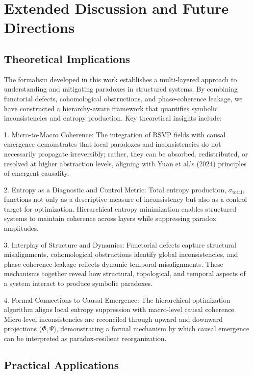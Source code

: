 \documentclass[12pt]{article}
\theoremstyle{plain}
\begin{document}
\section{Extended Discussion and Future Directions}

\subsection{Theoretical Implications}

The formalism developed in this work establishes a multi-layered approach to understanding and mitigating paradoxes in structured systems. By combining functorial defects, cohomological obstructions, and phase-coherence leakage, we have constructed a hierarchy-aware framework that quantifies symbolic inconsistencies and entropy production. Key theoretical insights include:

1. Micro-to-Macro Coherence: The integration of RSVP fields with causal emergence demonstrates that local paradoxes and inconsistencies do not necessarily propagate irreversibly; rather, they can be absorbed, redistributed, or resolved at higher abstraction levels, aligning with Yuan et al.’s (2024) principles of emergent causality.

2. Entropy as a Diagnostic and Control Metric: Total entropy production, \(\sigma_{\mathrm{total}}\), functions not only as a descriptive measure of inconsistency but also as a control target for optimization. Hierarchical entropy minimization enables structured systems to maintain coherence across layers while suppressing paradox amplitudes.

3. Interplay of Structure and Dynamics: Functorial defects capture structural misalignments, cohomological obstructions identify global inconsistencies, and phase-coherence leakage reflects dynamic temporal misalignments. These mechanisms together reveal how structural, topological, and temporal aspects of a system interact to produce symbolic paradoxes.

4. Formal Connections to Causal Emergence: The hierarchical optimization algorithm aligns local entropy suppression with macro-level causal coherence. Micro-level inconsistencies are reconciled through upward and downward projections (\(\Phi, \Psi\)), demonstrating a formal mechanism by which causal emergence can be interpreted as paradox-resilient reorganization.

\subsection{Practical Applications}
\end{document}
